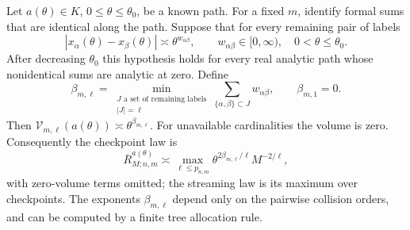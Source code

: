 \begin{theorem}\label{thm:collision-tree}
Let $a(\theta)\in K$, $0\le\theta\le\theta_0$, be a known path.
For a fixed $m$, identify formal sums that are identical along the path.
Suppose that for every remaining pair of labels
\[
 |x_\alpha(\theta)-x_\beta(\theta)|
       \asymp\theta^{w_{\alpha\beta}},\qquad
 w_{\alpha\beta}\in[0,\infty),\quad 0<\theta\le\theta_0.
\]
After decreasing $\theta_0$ this hypothesis holds for every real analytic
path whose nonidentical sums are analytic at zero. Define
\begin{equation}\label{eq:tree-energy}
 \beta_{m,\ell}=
   \min_{\substack{J\text{ a set of remaining labels}\\|J|=\ell}}
         \sum_{\{\alpha,\beta\}\subset J}w_{\alpha\beta},
 \qquad \beta_{m,1}=0.
\end{equation}
Then $\mathcal V_{m,\ell}(a(\theta))\asymp
\theta^{\beta_{m,\ell}}$. For unavailable cardinalities the volume is
zero. Consequently the checkpoint law is
\begin{equation}\label{eq:tree-law}
 \overline R_{M;n,m}^{a(\theta)}\asymp
 \max_{\ell\le p_{n,m}}
       \theta^{2\beta_{m,\ell}/\ell}M^{-2/\ell},
\end{equation}
with zero-volume terms omitted; the streaming law is its maximum over
checkpoints. The exponents $\beta_{m,\ell}$ depend only on the pairwise
collision orders, and can be computed by a finite tree allocation rule.
\end{theorem}
